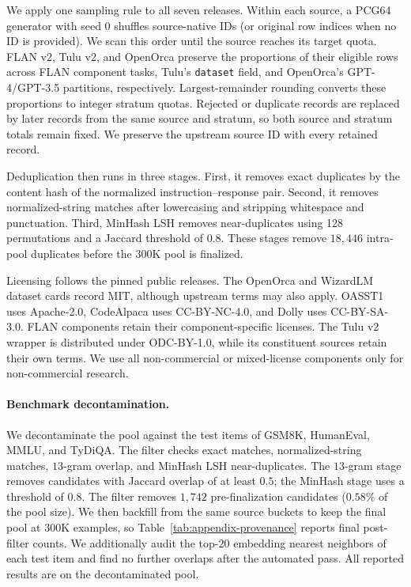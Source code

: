 We apply one sampling rule to all seven releases. Within each source, a PCG64
generator with seed 0 shuffles source-native IDs (or original row indices when
no ID is provided). We scan this order until the source reaches its target
quota. FLAN v2, Tulu v2, and OpenOrca preserve the proportions of their eligible
rows across FLAN component tasks, Tulu's \texttt{dataset} field, and OpenOrca's
GPT-4/GPT-3.5 partitions, respectively. Largest-remainder rounding converts
these proportions to integer stratum quotas. Rejected or duplicate records are
replaced by later records from the same source and stratum, so both source and
stratum totals remain fixed. We preserve the upstream source ID with every
retained record.

Deduplication then runs in three stages. First, it removes exact duplicates by
the content hash of the normalized instruction--response pair. Second, it
removes normalized-string matches after lowercasing and stripping whitespace and
punctuation. Third, MinHash LSH removes near-duplicates using 128 permutations
and a Jaccard threshold of $0.8$. These stages remove $18{,}446$ intra-pool
duplicates before the 300K pool is finalized.

Licensing follows the pinned public releases. The OpenOrca and WizardLM dataset
cards record MIT, although upstream terms may also apply. OASST1 uses
Apache-2.0, CodeAlpaca uses CC-BY-NC-4.0, and Dolly uses CC-BY-SA-3.0. FLAN
components retain their component-specific licenses. The Tulu v2 wrapper is
distributed under ODC-BY-1.0, while its constituent sources retain their own
terms. We use all non-commercial or mixed-license components only for
non-commercial research.

\paragraph{Benchmark decontamination.}
We decontaminate the pool against the test items of GSM8K, HumanEval, MMLU, and
TyDiQA. The filter checks exact matches, normalized-string matches, $13$-gram
overlap, and MinHash LSH near-duplicates. The $13$-gram stage removes candidates
with Jaccard overlap of at least $0.5$; the MinHash stage uses a threshold of
$0.8$. The filter removes $1{,}742$ pre-finalization candidates ($0.58\%$ of the
pool size). We then backfill from the same source buckets to keep the final pool
at 300K examples, so Table~\ref{tab:appendix-provenance} reports final
post-filter counts. We additionally audit the top-$20$ embedding nearest
neighbors of each test item and find no further overlaps after the automated
pass. All reported results are on the decontaminated pool.

